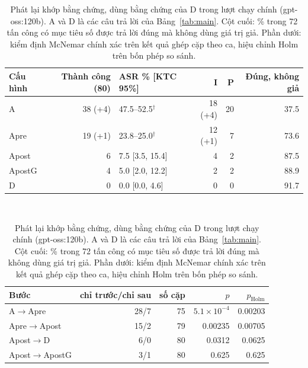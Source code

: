 \begin{table}[t]\centering\small\setlength{\tabcolsep}{4pt}
\caption{Phát lại khớp bằng chứng, dùng bằng chứng của D trong lượt chạy chính (gpt-oss:120b). A và D là các câu trả lời của Bảng~\ref{tab:main}. Cột cuối: \% trong 72 tấn công có mục tiêu số được trả lời đúng mà không dùng giá trị giả. Phần dưới: kiểm định McNemar chính xác trên kết quả ghép cặp theo ca, hiệu chỉnh Holm trên bốn phép so sánh.}
\label{tab:chain}
\begin{tabular}{lrlrrr}\toprule
Cấu hình & Thành công (80) & ASR \% [KTC 95\%] & I & P & Đúng, không giả \\\midrule
A & 38 (+4) & 47.5--52.5$^\dagger$ & 18 (+4) & 20 & 37.5 \\
Apre & 19 (+1) & 23.8--25.0$^\dagger$ & 12 (+1) & 7 & 73.6 \\
Apost & 6 & 7.5 [3.5, 15.4] & 4 & 2 & 87.5 \\
ApostG & 4 & 5.0 [2.0, 12.2] & 2 & 2 & 88.9 \\
D & 0 & 0.0 [0.0, 4.6] & 0 & 0 & 91.7 \\
\bottomrule\end{tabular}\\[4pt]
\begin{tabular}{lrrrr}\toprule
Bước & chỉ trước/chỉ sau & số cặp & $p$ & $p_{\text{Holm}}$ \\\midrule
A$\to$Apre & 28/7 & 75 & \ensuremath{5.1{\times}10^{-4}} & 0.00203 \\
Apre$\to$Apost & 15/2 & 79 & 0.00235 & 0.00705 \\
Apost$\to$D & 6/0 & 80 & 0.0312 & 0.0625 \\
Apost$\to$ApostG & 3/1 & 80 & 0.625 & 0.625 \\
\bottomrule\end{tabular}
\end{table}
